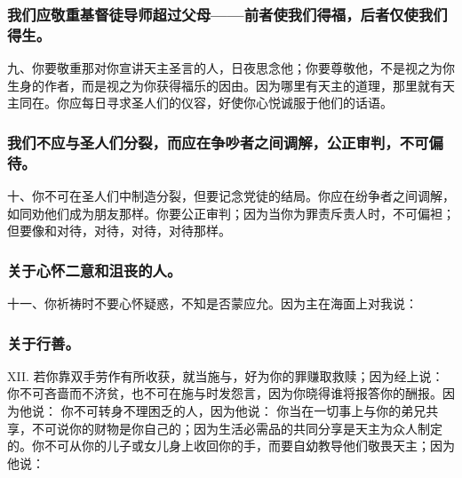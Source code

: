 
\subsubsection{我们应敬重基督徒导师超过父母——前者使我们得福，后者仅使我们得生。}

九、你要敬重那对你宣讲天主圣言的人，日夜思念他；你要尊敬他，不是视之为你生身的作者，而是视之为你获得福乐的因由。因为哪里有天主的道理，那里就有天主同在。你应每日寻求圣人们的仪容，好使你心悦诚服于他们的话语。\par


\subsubsection{我们不应与圣人们分裂，而应在争吵者之间调解，公正审判，不可偏待。}

十、你不可在圣人们中制造分裂，但要记念党徒的结局。你应在纷争者之间调解，如同劝他们成为朋友那样。你要公正审判；因为当你为罪责斥责人时，不可偏袒；但要像和对待，对待，对待，对待那样。\par


\subsubsection{关于心怀二意和沮丧的人。}

十一、你祈祷时不要心怀疑惑，不知是否蒙应允。因为主在海面上对我说： \par


\subsubsection{关于行善。}

XII. 若你靠双手劳作有所收获，就当施与，好为你的罪赚取救赎；因为经上说：  你不可吝啬而不济贫，也不可在施与时发怨言，因为你晓得谁将报答你的酬报。因为他说：  你不可转身不理困乏的人，因为他说：  你当在一切事上与你的弟兄共享，不可说你的财物是你自己的；因为生活必需品的共同分享是天主为众人制定的。你不可从你的儿子或女儿身上收回你的手，而要自幼教导他们敬畏天主；因为他说： \par

